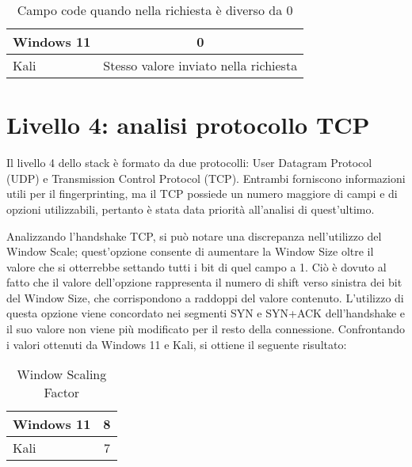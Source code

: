 \begin{table}[h]
	\centering
	\begin{tabular}{  l | c }
		\hline
		\rowcolor{blue!10} Windows 11 & 0
		\\
		\hline
		\rowcolor{red!10} Kali & Stesso valore inviato nella richiesta
		\\
		\hline

	\end{tabular}
	\caption{Campo code quando nella richiesta è diverso da 0}
	\label{tab:code}
\end{table}

\section{Livello 4: analisi protocollo TCP}
Il livello 4 dello stack è formato da due protocolli: User Datagram Protocol (UDP) e Transmission Control Protocol (TCP). Entrambi forniscono informazioni utili per il fingerprinting, ma il TCP possiede un numero maggiore di campi e di opzioni utilizzabili, pertanto è stata data priorità all'analisi di quest'ultimo.

Analizzando l'handshake TCP, si può notare una discrepanza nell'utilizzo del Window Scale; quest'opzione consente di aumentare la Window Size oltre il valore che si otterrebbe settando tutti i bit di quel campo a 1.
Ciò è dovuto al fatto che il valore dell'opzione rappresenta il numero di shift verso sinistra dei bit del Window Size, che corrispondono a raddoppi del valore contenuto. 
L'utilizzo di questa opzione viene concordato nei segmenti SYN e SYN+ACK dell'handshake e il suo valore non viene più modificato per il resto della connessione. Confrontando i valori ottenuti da Windows 11 e Kali, si ottiene il seguente risultato:
\\
\begin{table}[htb]
	\centering
	\begin{tabular}{ l | c }
		\hline
		\rowcolor{blue!10} Windows 11 & 8
		\\
		\hline
		\rowcolor{red!10} Kali & 7
		\\
		\hline
		
	\end{tabular}
	\caption{Window Scaling Factor}
	\label{tab:Window Scale}
\end{table}

